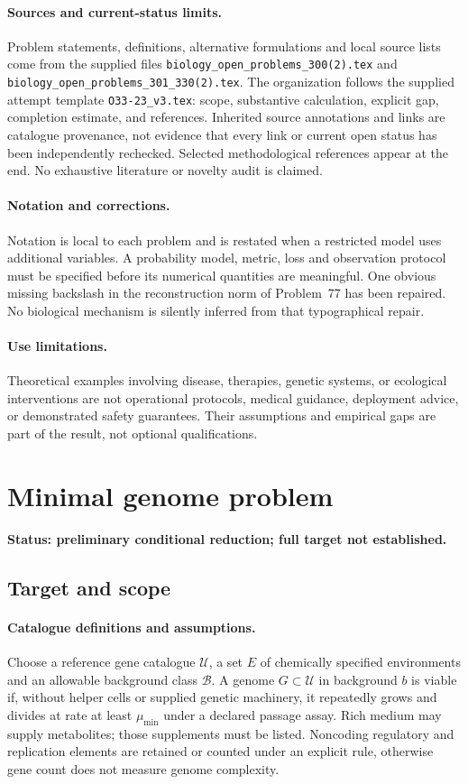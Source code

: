 \documentclass[11pt]{article}
\begin{document}
\paragraph{Sources and current-status limits.}
Problem statements, definitions, alternative formulations and local source lists
come from the supplied files
\texttt{biology\_open\_problems\_300(2).tex} and
\texttt{biology\_open\_problems\_301\_330(2).tex}.
The organization follows the supplied attempt template
\texttt{O33-23\_v3.tex}: scope, substantive calculation, explicit gap,
completion estimate, and references. Inherited source annotations and links are
catalogue provenance, not evidence that every link or current open status has
been independently rechecked. Selected methodological references appear at the
end. No exhaustive literature or novelty audit is claimed.

\paragraph{Notation and corrections.}
Notation is local to each problem and is restated when a restricted model uses
additional variables. A probability model, metric, loss and observation protocol
must be specified before its numerical quantities are meaningful. One obvious
missing backslash in the reconstruction norm of Problem~77 has been repaired.
No biological mechanism is silently inferred from that typographical repair.

\paragraph{Use limitations.}
Theoretical examples involving disease, therapies, genetic systems, or ecological
interventions are not operational protocols, medical guidance, deployment advice,
or demonstrated safety guarantees. Their assumptions and empirical gaps are part
of the result, not optional qualifications.


\section*{Minimal genome problem}
\label{prob:268}
\noindent\textbf{Status: preliminary conditional reduction; full target not established.}
\subsection{Target and scope}
\paragraph{Catalogue definitions and assumptions.}
Choose a reference gene catalogue $\mathcal U$, a set $E$ of chemically specified environments and an allowable background class $\mathcal B$. A genome $G\subset\mathcal U$ in background $b$ is viable if, without helper cells or supplied genetic machinery, it repeatedly grows and divides at rate at least $\mu_{\min}$ under a declared passage assay. Rich medium may supply metabolites; those supplements must be listed. Noncoding regulatory and replication elements are retained or counted under an explicit rule, otherwise gene count does not measure genome complexity.
\end{document}
